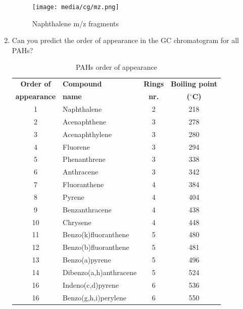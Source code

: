\documentclass{article}
\begin{document}
\begin{enumerate}
    \vspace*{.3cm}
    \begin{figure}[ht!]
        \centering
        \texttt{[image: media/cg/mz.png]}
        \label{fig:m/z}
        \caption{Naphthalene m/z fragments}
    \end{figure}
    \vspace*{.5cm}

    \item Can you predict the order of appearance in the GC chromatogram for all PAHs?
    \vspace*{.5cm}
    \begin{table}[H]
        \centering
            {\footnotesize}
            \caption{PAHs order of appearance}
        \begin{tabular}{@{}clcc@{}}
            \toprule
            \textbf{Order of} & \textbf{Compound} & \textbf{Rings} & \textbf{Boiling point}\footnotemark\\
            \textbf{appearance} & \textbf{name} & \textbf{nr.} & \textbf{($^\circ$C)}\\
            \midrule
            1 & Naphthalene & 2 & 218\\
            2 & Acenaphthene & 3 & 278\\
            3 & Acenaphthylene & 3 & 280\\
            4 & Fluorene & 3 & 294\\
            5 & Phenanthrene & 3 & 338\\
            6 & Anthracene & 3 & 342\\
            7 & Fluoranthene & 4 & 384\\
            8 & Pyrene & 4 & 404\\
            9 & Benzanthracene & 4 & 438 \\
            10 & Chrysene & 4 & 448\\
            11 & Benzo(k)fluoranthene & 5 & 480\\
            12 & Benzo(b)fluoranthene & 5 & 481\\
            13 & Benzo(a)pyrene & 5 & 496\\
            14 & Dibenzo(a,h)anthracene & 5 & 524\\
            16 & Indeno(c,d)pyrene & 6 & 536\\
            16 & Benzo(g,h,i)perylene & 6 & 550\\
            \bottomrule
        \end{tabular}
        \label{tab:gc-appearance}
    \end{table}
\end{enumerate}
\vfill
\end{document}
